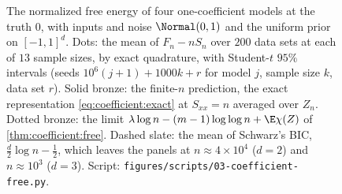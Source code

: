 \begin{refsection}
\begin{figure}[!t]
\begin{fullwidth}
\vspace{1mm}
\end{fullwidth}
\caption{The normalized free energy of four one-coefficient models at the truth $0$, with inputs and noise $\Normal(0,1)$ and the uniform prior on $[-1,1]^d$. Dots: the mean of $F_n-nS_n$ over $200$ data sets at each of $13$ sample sizes, by exact quadrature, with Student-$t$ $95\%$ intervals (seeds $10^6(j+1)+1000k+r$ for model $j$, sample size $k$, data set $r$). Solid bronze: the finite-$n$ prediction, the exact representation \eqref{eq:coefficient:exact} at $S_{xx}=n$ averaged over $Z_n$. Dotted bronze: the limit $\lambda\log n-(m-1)\log\log n+\E\chi(Z)$ of \cref{thm:coefficient:free}. Dashed slate: the mean of Schwarz's BIC, $\frac d2\log n-\frac12$, which leaves the panels at $n\approx4\times10^4$ ($d=2$) and $n\approx10^3$ ($d=3$). Script: \texttt{figures/scripts/03-coefficient-free.py}.}\label{fig:coefficient:free}
\end{figure}


\end{refsection}
